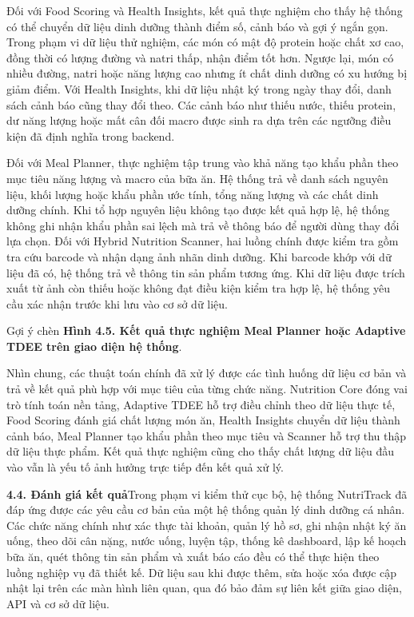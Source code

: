 Đối với Food Scoring và Health Insights, kết quả thực nghiệm cho thấy hệ thống có thể chuyển dữ liệu dinh dưỡng thành điểm số, cảnh báo và gợi ý ngắn gọn. Trong phạm vi dữ liệu thử nghiệm, các món có mật độ protein hoặc chất xơ cao, đồng thời có lượng đường và natri thấp, nhận điểm tốt hơn. Ngược lại, món có nhiều đường, natri hoặc năng lượng cao nhưng ít chất dinh dưỡng có xu hướng bị giảm điểm. Với Health Insights, khi dữ liệu nhật ký trong ngày thay đổi, danh sách cảnh báo cũng thay đổi theo. Các cảnh báo như thiếu nước, thiếu protein, dư năng lượng hoặc mất cân đối macro được sinh ra dựa trên các ngưỡng điều kiện đã định nghĩa trong backend.

Đối với Meal Planner, thực nghiệm tập trung vào khả năng tạo khẩu phần theo mục tiêu năng lượng và macro của bữa ăn. Hệ thống trả về danh sách nguyên liệu, khối lượng hoặc khẩu phần ước tính, tổng năng lượng và các chất dinh dưỡng chính. Khi tổ hợp nguyên liệu không tạo được kết quả hợp lệ, hệ thống không ghi nhận khẩu phần sai lệch mà trả về thông báo để người dùng thay đổi lựa chọn. Đối với Hybrid Nutrition Scanner, hai luồng chính được kiểm tra gồm tra cứu barcode và nhận dạng ảnh nhãn dinh dưỡng. Khi barcode khớp với dữ liệu đã có, hệ thống trả về thông tin sản phẩm tương ứng. Khi dữ liệu được trích xuất từ ảnh còn thiếu hoặc không đạt điều kiện kiểm tra hợp lệ, hệ thống yêu cầu xác nhận trước khi lưu vào cơ sở dữ liệu.

Gợi ý chèn \textbf{Hình 4.5. Kết quả thực nghiệm Meal Planner hoặc Adaptive TDEE trên giao diện hệ thống}.

Nhìn chung, các thuật toán chính đã xử lý được các tình huống dữ liệu cơ bản và trả về kết quả phù hợp với mục tiêu của từng chức năng. Nutrition Core đóng vai trò tính toán nền tảng, Adaptive TDEE hỗ trợ điều chỉnh theo dữ liệu thực tế, Food Scoring đánh giá chất lượng món ăn, Health Insights chuyển dữ liệu thành cảnh báo, Meal Planner tạo khẩu phần theo mục tiêu và Scanner hỗ trợ thu thập dữ liệu thực phẩm. Kết quả thực nghiệm cũng cho thấy chất lượng dữ liệu đầu vào vẫn là yếu tố ảnh hưởng trực tiếp đến kết quả xử lý.

\textbf{4.4. Đánh giá kết quả}Trong phạm vi kiểm thử cục bộ, hệ thống NutriTrack đã đáp ứng được các yêu cầu cơ bản của một hệ thống quản lý dinh dưỡng cá nhân. Các chức năng chính như xác thực tài khoản, quản lý hồ sơ, ghi nhận nhật ký ăn uống, theo dõi cân nặng, nước uống, luyện tập, thống kê dashboard, lập kế hoạch bữa ăn, quét thông tin sản phẩm và xuất báo cáo đều có thể thực hiện theo luồng nghiệp vụ đã thiết kế. Dữ liệu sau khi được thêm, sửa hoặc xóa được cập nhật lại trên các màn hình liên quan, qua đó bảo đảm sự liên kết giữa giao diện, API và cơ sở dữ liệu.

